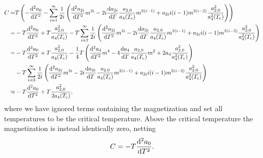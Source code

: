 \begin{align*}
	C =& T\left(-\dv[2]{a_{0}}{T} - \sum\limits_{i = 1}^{\infty}\frac{1}{2i}\left(\dv[2]{a_{2i}}{T}m^{2i} - 2i\dv{a_{2i}}{T}\frac{a_{2, 0}}{a_{4}(T_{\text{c}})}m^{2(i - 1)} + a_{2i}i(i - 1)m^{2(i - 2)}\frac{a_{2, 0}^{2}}{a_{4}^{2}(T_{\text{c}})}\right)\right) \\
	  =& -T\dv[2]{a_{0}}{T} + T\frac{a_{2, 0}^{2}}{a_{4}(T_{\text{c}})} - T\sum\limits_{i = 2}^{\infty}\frac{1}{2i}\left(\dv[2]{a_{2i}}{T}m^{2i} - 2i\dv{a_{2i}}{T}\frac{a_{2, 0}}{a_{4}(T_{\text{c}})}m^{2(i - 1)} + a_{2i}i(i - 1)m^{2(i - 2)}\frac{a_{2, 0}^{2}}{a_{4}^{2}(T_{\text{c}})}\right) \\
	  =& -T\dv[2]{a_{0}}{T} + T\frac{a_{2, 0}^{2}}{a_{4}(T_{\text{c}})} - \frac{1}{4}T\left(\dv[2]{a_{4}}{T}m^{4} - 4\dv{a_{4}}{T}\frac{a_{2, 0}}{a_{4}(T_{\text{c}})}m^{2} + 2a_{4}\frac{a_{2, 0}^{2}}{a_{4}^{2}(T_{\text{c}})}\right) \\
	   &- T\sum\limits_{i = 3}^{\infty}\frac{1}{2i}\left(\dv[2]{a_{2i}}{T}m^{2i} - 2i\dv{a_{2i}}{T}\frac{a_{2, 0}}{a_{4}(T_{\text{c}})}m^{2(i - 1)} + a_{2i}i(i - 1)m^{2(i - 2)}\frac{a_{2, 0}^{2}}{a_{4}^{2}(T_{\text{c}})}\right) \\
	  \approx& -T\dv[2]{a_{0}}{T} + T\frac{a_{2, 0}^{2}}{2a_{4}(T_{\text{c}})},
\end{align*}
where we have ignored terms containing the magnetization and set all temperatures to be the critical temperature. Above the critical temperature the magnetization is instead identically zero, netting
\begin{align*}
	C = -T\dv[2]{a_{0}}{T}.
\end{align*}

